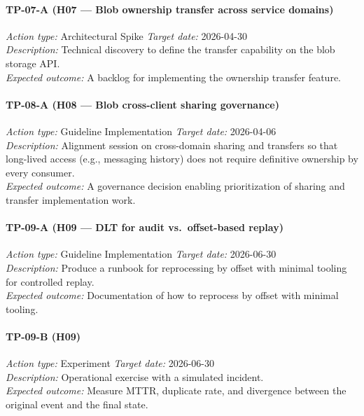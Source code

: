 \paragraph{TP-07-A \textnormal{(H07 — Blob ownership transfer across service domains)}}
\textit{Action type:} Architectural Spike \quad \textit{Target date:} 2026-04-30 \\
\textit{Description:} Technical discovery to define the transfer capability on
the blob storage API. \\
\textit{Expected outcome:} A backlog for implementing the ownership transfer
feature.

\paragraph{TP-08-A \textnormal{(H08 — Blob cross-client sharing governance)}}
\textit{Action type:} Guideline Implementation \quad \textit{Target date:} 2026-04-06 \\
\textit{Description:} Alignment session on cross-domain sharing and transfers
so that long-lived access (e.g., messaging history) does not require definitive
ownership by every consumer. \\
\textit{Expected outcome:} A governance decision enabling prioritization of
sharing and transfer implementation work.

\paragraph{TP-09-A \textnormal{(H09 — DLT for audit vs.\ offset-based replay)}}
\textit{Action type:} Guideline Implementation \quad \textit{Target date:} 2026-06-30 \\
\textit{Description:} Produce a runbook for reprocessing by offset with minimal
tooling for controlled replay. \\
\textit{Expected outcome:} Documentation of how to reprocess by offset with
minimal tooling.

\paragraph{TP-09-B \textnormal{(H09)}}
\textit{Action type:} Experiment \quad \textit{Target date:} 2026-06-30 \\
\textit{Description:} Operational exercise with a simulated incident. \\
\textit{Expected outcome:} Measure MTTR, duplicate rate, and divergence between
the original event and the final state.

